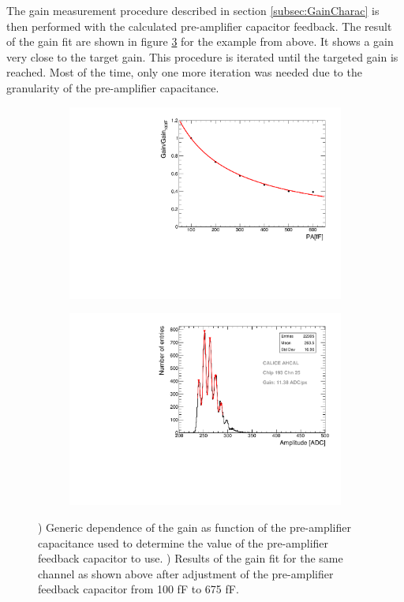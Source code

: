 The gain measurement procedure described in section \ref{subsec:GainCharac} is then performed with the calculated pre-amplifier capacitor feedback. The result of the gain fit are shown in figure \ref{fig:Gain675fF} for the example from above. It shows a gain very close to the target gain. This procedure is iterated until the targeted gain is reached. Most of the time, only one more iteration was needed due to the granularity of the pre-amplifier capacitance.

\begin{figure}[htbp!]
  \centering
  \begin{subfigure}[t]{0.49\textwidth}
    \includegraphics[width=1.\linewidth]{../Thesis_Plots/Commissioning/Plots/GainvsPA.pdf}
    \caption{} \label{fig:PA_curve}
  \end{subfigure}
  \hfill
  \begin{subfigure}[t]{0.49\textwidth}
    \includegraphics[width=1.\linewidth]{../Thesis_Plots/Commissioning/Plots/Gain675fF_MainzHBU4.pdf}
    \caption{} \label{fig:Gain675fF}
  \end{subfigure}
  \caption{) Generic dependence of the gain as function of the pre-amplifier capacitance used to determine the value of the pre-amplifier feedback capacitor to use. ) Results of the gain fit for the same channel as shown above after adjustment of the pre-amplifier feedback capacitor from 100 fF to 675 fF.}
\end{figure}

